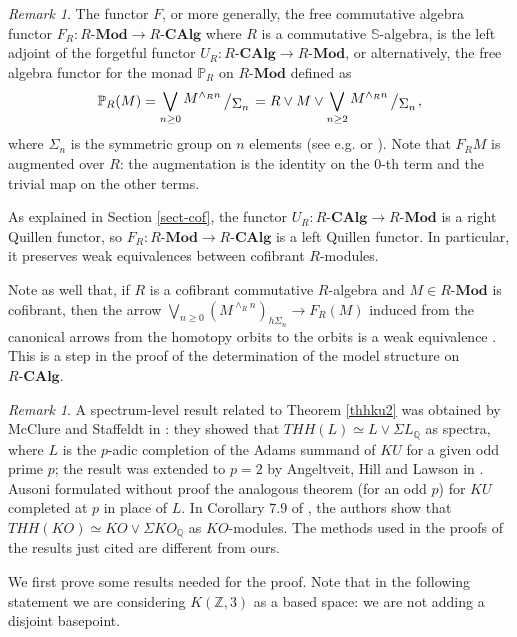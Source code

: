 \documentclass[a4paper,11pt]{amsart} %
\theoremstyle{definition} \newtheorem{defn}[equation]{Definition}
\theoremstyle{remark} \newtheorem{notation}[equation]{Notation}
\theoremstyle{plain} \newtheorem{teo}[equation]{Theorem}
\theoremstyle{plain} \newtheorem{lema}[equation]{Lemma}
\theoremstyle{plain} \newtheorem{prop}[equation]{Proposition}
\theoremstyle{plain} \newtheorem{corolario}[equation]{Corollary}
\theoremstyle{remark} \newtheorem{obs}[equation]{Remark}
\theoremstyle{remark} \newtheorem{sideobs}[equation]{Side remark}
\theoremstyle{remark} \newtheorem{ejercicio}[equation]{Exercise}
\theoremstyle{definition} \newtheorem{notn}[equation]{Notation}
\theoremstyle{remark} \newtheorem{ej}[equation]{Example}
\theoremstyle{remark} \newtheorem{contraej}[equation]{Counterexample}
\theoremstyle{plain} \newtheorem{conj}[equation]{Conjecture}
\renewcommand{\1}{\ensuremath{\mathbbm{1}}}
\newcommand{\Q}{\mathbb{Q}}
\renewcommand{\S}{\mathbb{S}}
\newcommand{\Z}{\mathbb{Z}}
\newcommand{\bobs}{\begin{obs}}
\newcommand{\eobs}{\end{obs}}
\newcommand{\CAlg}{\mbox{-}\mathbf{CAlg}}
\newcommand{\RMod}{\ensuremath{R}\mbox{-}\mathbf{Mod}}
\newcommand{\RCAlg}{\ensuremath{R}\mbox{-}\ensuremath{\mathbf{CAlg}}}
\newcommand{\bigslant}[2]{{\raisebox{.2em}{$#1$}\left/\raisebox{-.2em}{$#2$}\right.}}
\numberwithin{equation}{section}
\begin{document}
%
%
%
%
%
%
%
%

%

\bobs \label{f-monadic} The functor $F$, or more generally, the free commutative algebra functor $F_R:\RMod\to R\CAlg$ where $R$ is a commutative $\S$-algebra, is the left adjoint of the forgetful functor $U_R: R\CAlg\to\RMod$, or alternatively, the free algebra functor for the monad $\mathbb P_R$ on $\RMod$ defined as 
\begin{equation}\label{monadwedge} \mathbb P_R(M)=\bigvee_{n\geq 0} \bigslant{M^{\wedge_R n}}{\Sigma_n} = R \vee M \vee \bigvee_{n\geq 2} \bigslant{M^{\wedge_R n}}{\Sigma_n},\end{equation} where $\Sigma_n$ is the symmetric group on $n$ elements (see e.g. \cite[II.7.1]{ekmm} or \cite[Section 1]{basterra}). Note that $F_RM$ is augmented over $R$: the augmentation is the identity on the $0$-th term and the trivial map on the other terms. %
%
%

As explained in Section \ref{sect-cof}, the functor $U_R:\RCAlg\to \RMod$ is a right Quillen functor, so $F_R:\RMod \to \RCAlg$ is a left Quillen functor. In particular, it preserves weak equivalences between cofibrant $R$-modules. %

Note as well that, if $R$ is a cofibrant commutative $R$-algebra and $M\in \RMod$ is %
cofibrant, then the arrow $\bigvee_{n\geq 0} (M^{\wedge_R n})_{h\Sigma_n}\to F_R(M)$ induced from the canonical arrows from the homotopy orbits to the orbits is a %
weak equivalence \cite[III.5.1]{ekmm}. This is a step in the proof of the determination of the model structure on $\RCAlg$. %
\eobs

\bobs \label{antecedentes} A spectrum-level result related to Theorem \ref{thhku2} was obtained by McClure and Staffeldt in \cite[Theorem 8.1]{mc-st}: they showed that $THH(L)\simeq L \vee \Sigma L_\Q$ as spectra, where $L$ is the $p$-adic completion of the Adams summand of $KU$ for a given odd prime $p$; the result was extended to $p=2$ by Angeltveit, Hill and Lawson in \cite[2.3]{thhko}. Ausoni \cite[Proposition 7.13]{ausoni-thhku} formulated without proof the analogous theorem (for an odd $p$) for $KU$ completed at $p$ in place of $L$. In Corollary 7.9 of \cite{thhko}, the authors show that $THH(KO)\simeq KO\vee \Sigma KO_\Q$ as $KO$-modules. The methods used in the proofs of the results just cited are different from ours.
\eobs

We first prove some results needed for the proof. Note that in the following statement we are considering $K(\Z,3)$ as a based space: we are not adding a disjoint basepoint.
\end{document}
